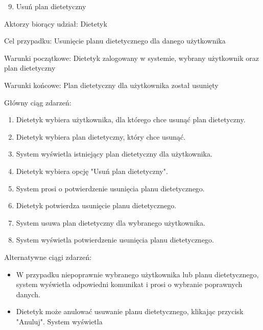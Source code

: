 \documentclass[
]{article}
\providecommand{\tightlist}{%
  \setlength{\itemsep}{0pt}\setlength{\parskip}{0pt}}
\begin{document}
{}

\begin{enumerate}
\setcounter{enumi}{8}
\tightlist
\item
  {Usuń plan dietetyczny}
\end{enumerate}

{Aktorzy biorący udział: Dietetyk}

{Cel przypadku: Usunięcie planu dietetycznego dla danego użytkownika}

{Warunki początkowe: Dietetyk zalogowany w systemie, wybrany użytkownik
oraz plan dietetyczny}

{Warunki końcowe: Plan dietetyczny dla użytkownika został usunięty}

{Główny ciąg zdarzeń:}

\begin{enumerate}
\tightlist
\item
  {Dietetyk wybiera użytkownika, dla którego chce usunąć plan
  dietetyczny.}
\item
  {Dietetyk wybiera plan dietetyczny, który chce usunąć.}
\item
  {System wyświetla istniejący plan dietetyczny dla użytkownika.}
\item
  {Dietetyk wybiera opcję "Usuń plan dietetyczny".}
\item
  {System prosi o potwierdzenie usunięcia planu dietetycznego.}
\item
  {Dietetyk potwierdza usunięcie planu dietetycznego.}
\item
  {System usuwa plan dietetyczny dla wybranego użytkownika.}
\item
  {System wyświetla potwierdzenie usunięcia planu dietetycznego.}
\end{enumerate}

{Alternatywne ciągi zdarzeń:}

\begin{itemize}
\tightlist
\item
  {W przypadku niepoprawnie wybranego użytkownika lub planu
  dietetycznego, system wyświetla odpowiedni komunikat i prosi o
  wybranie poprawnych danych.}
\item
  {Dietetyk może anulować usuwanie planu dietetycznego, klikając
  przycisk "Anuluj". System wyświetla}
\end{itemize}

\hypertarget{h.moo0g2hu8rf}{%
\subsection{\texorpdfstring{{}}{}}\label{h.moo0g2hu8rf}}
\end{document}
